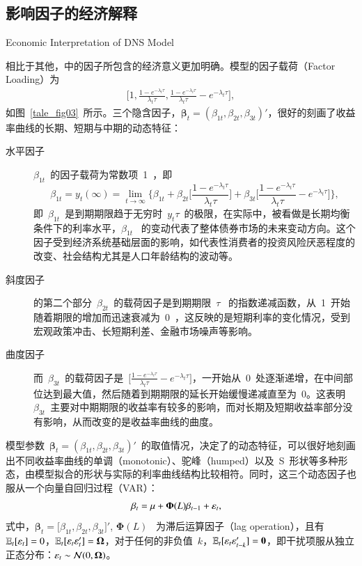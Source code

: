 \subsection{影响因子的经济解释}{Economic Interpretation of DNS Model}\label{econ}

相比于其他\tsm{}，\dns 中的因子所包含的经济意义更加明确。模型的因子载荷（Factor Loading）为
  \begin{align*}
    \bigg[ 1, \frac{1-e^{-\lambda_{t} \tau}} {\lambda_{t} \tau},
    \frac{1-e^{-\lambda_{t} \tau}} {\lambda_{t} \tau} - e^{-\lambda_{t} \tau} \bigg],
  \end{align*}
如图~\eqref{tale_fig03}~所示。三个隐含因子，$\mathbf{\beta}_t=(\beta_{1t},\beta_{2t},\beta_{3t})'$，很好的刻画了收益率曲线的长期、短期与中期的动态特征：
\begin{description}
  \item[水平因子] $\beta_{1t}$~的因子载荷为常数项~1~，即 \[\beta_{1t}=y_{t}(\infty)=\lim_{t\rightarrow \infty} \Big\{\beta_{1t}
        + \beta_{2t} \big[\frac{1-e^{-\lambda_{t} \tau}} {\lambda_{t} \tau} \big]
        + \beta_{3t}\big[\frac{1-e^{-\lambda_{t} \tau}} {\lambda_{t} \tau} - e^{-\lambda_{t} \tau} \big]\Big\},\]
        即~$\beta_{1t}$~是到期期限趋于无穷时~$y_t{\tau}$~的极限，在实际中，被看做是长期均衡条件下的利率水平，$\beta_{1t}$~ 的变动代表了整体债券市场的未来变动方向。这个因子受到经济系统基础层面的影响，如代表性消费者的投资风险厌恶程度的改变、社会结构尤其是人口年龄结构的波动等。
  \item[斜度因子] \dns 的第二个部分~$\beta_{2t}$~的载荷因子是到期期限~$\tau$~ 的指数递减函数，从~1~开始随着期限的增加而迅速衰减为~0~，这反映的是短期利率的变化情况，受到宏观政策冲击、长短期利差、金融市场噪声等影响。
  \item[曲度因子] 而~$\beta_{3t}$~的载荷因子是~$\Big[\frac{1-e^{-\lambda_{t} \tau}} {\lambda_{t} \tau} - e^{-\lambda_{t} \tau}\Big]$，一开始从~0~处逐渐递增，在中间部位达到最大值，然后随着到期期限的延长开始缓慢递减直至为~0。这表明~$\beta_{3t}$~主要对中期期限的收益率有较多的影响，而对长期及短期收益率部分没有影响，从而改变的是收益率曲线的曲度。
\end{description}
模型参数~$\mathbf{\beta}_t=(\beta_{1t},\beta_{2t},\beta_{3t})'$~的取值情况，决定了\ts 的动态特征，可以很好地刻画出不同收益率曲线的单调（monotonic）、驼峰（humped）以及~S~形状等多种形态，由模型拟合的形状与实际的利率曲线结构比较相符。同时，这三个动态因子也服从一个向量自回归过程（VAR）：
  \begin{align}
    \mathbf{\beta}_t &= \mathbf{\mu} + \mathbf{\Phi}(L)\mathbf{\beta}_{t-1} + \mathbf{\varepsilon}_t,
  \end{align}
    式中，$\mathbf{\beta}_t = \big[\beta_{1t}, \beta_{2t}, \beta_{3t}\big]'$, $\mathbf{\Phi}(L)$~ 为滞后运算因子（lag operation），且有~$\mathbb{E}_t[\mathbf{\varepsilon}_t]=0$，$\mathbb{E}_t[\mathbf{\varepsilon}_t \mathbf{\varepsilon}_t']=\mathbf{\Omega}$，对于任何的非负值~$k$，$\mathbb{E}_t[\mathbf{\varepsilon}_t \mathbf{\varepsilon}_{t-k}']=\mathbf{0}$，即干扰项服从独立正态分布：$\mathbf{\varepsilon}_t \sim \mathcal{N}(0,\mathbf{\Omega})$。


